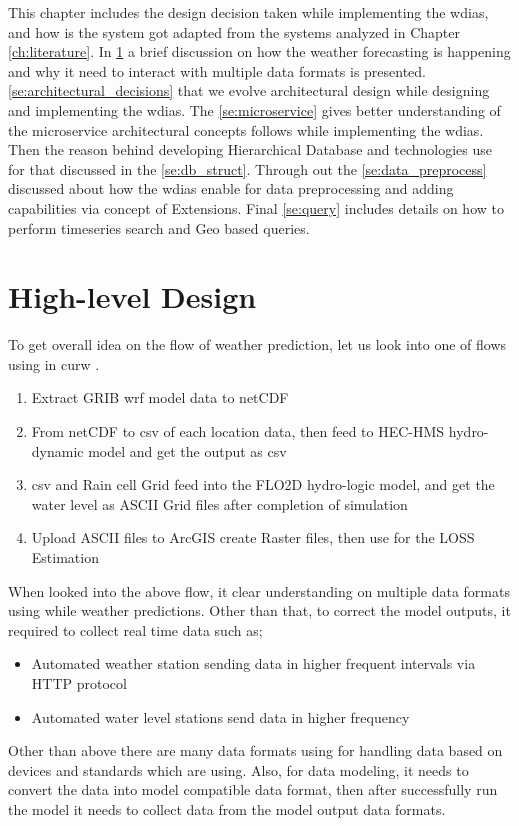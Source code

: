 This chapter includes the design decision taken while implementing the \acrfull{wdias}, and how is the system got adapted from the systems analyzed in Chapter \ref{ch:literature}.
In \cref{se:high_level_design} a brief discussion on how the weather forecasting is happening and why it need to interact with multiple data formats is presented.
\cref{se:architectural_decisions} that we evolve architectural design while designing and implementing the \acrshort{wdias}.
The \cref{se:microservice} gives better understanding of the microservice architectural concepts follows while implementing the \acrshort{wdias}.
Then the reason behind developing Hierarchical Database and technologies use for that discussed in the \cref{se:db_struct}.
Through out the \cref{se:data_preprocess} discussed about how the \acrshort{wdias} enable for data preprocessing and adding capabilities via concept of Extensions.
Final \cref{se:query} includes details on how to perform timeseries search and Geo based queries.

\section{High-level Design}
\label{se:high_level_design}

To get overall idea on the flow of weather prediction, let us look into one of flows using in \acrshort{curw} \cite{CUrWSL2017SL}.

\begin{enumerate}
    \item Extract \acrshort{GRIB} \acrshort{wrf} model data to \acrshort{netCDF}
    \item From \acrshort{netCDF} to \acrshort{csv} of each location data, then feed to HEC-HMS hydro-dynamic model and get the output as \acrshort{csv}
    \item \acrshort{csv} and Rain cell Grid feed into the FLO2D hydro-logic model, and get the water level as ASCII Grid files after completion of simulation
    \item Upload ASCII files to ArcGIS create Raster files, then use for the LOSS Estimation
\end{enumerate}
When looked into the above flow, it clear understanding on multiple data formats using while weather predictions.
Other than that, to correct the model outputs, it required to collect real time data such as;
\begin{itemize}
    \item Automated weather station sending data in higher frequent intervals via HTTP protocol
    \item Automated water level stations send data in higher frequency
\end{itemize}
Other than above there are many data formats using for handling data based on devices and standards which are using. Also, for data modeling, it needs to convert the data into model compatible data format, then after successfully run the model it needs to collect data from the model output data formats.

